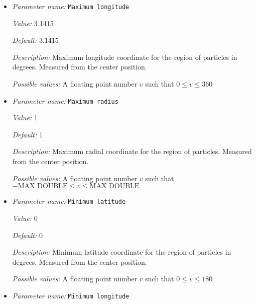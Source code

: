 \begin{itemize}
{\it Description:} Maximum latitude coordinate for the region of particles in degrees. Measured from the center position.


{\it Possible values:} A floating point number $v$ such that $0 \leq v \leq 180$
\item {\it Parameter name:} {\tt Maximum longitude}
\label{parameters:Postprocess/Particles/Generator/Uniform radial/Maximum longitude}


{\it Value:} 3.1415


{\it Default:} 3.1415


{\it Description:} Maximum longitude coordinate for the region of particles in degrees. Measured from the center position.


{\it Possible values:} A floating point number $v$ such that $0 \leq v \leq 360$
\item {\it Parameter name:} {\tt Maximum radius}
\label{parameters:Postprocess/Particles/Generator/Uniform radial/Maximum radius}


{\it Value:} 1


{\it Default:} 1


{\it Description:} Maximum radial coordinate for the region of particles. Measured from the center position.


{\it Possible values:} A floating point number $v$ such that $-\text{MAX\_DOUBLE} \leq v \leq \text{MAX\_DOUBLE}$
\item {\it Parameter name:} {\tt Minimum latitude}
\label{parameters:Postprocess/Particles/Generator/Uniform radial/Minimum latitude}


{\it Value:} 0


{\it Default:} 0


{\it Description:} Minimum latitude coordinate for the region of particles in degrees. Measured from the center position.


{\it Possible values:} A floating point number $v$ such that $0 \leq v \leq 180$
\item {\it Parameter name:} {\tt Minimum longitude}
\label{parameters:Postprocess/Particles/Generator/Uniform radial/Minimum longitude}



\end{itemize}
